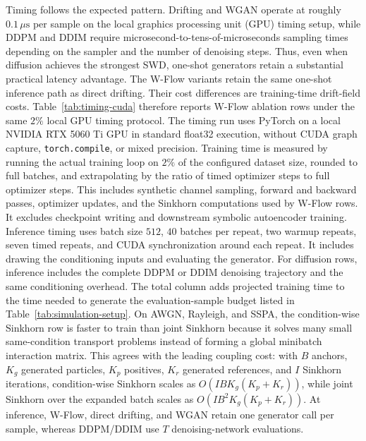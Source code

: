 \documentclass[10pt,journal]{IEEEtran}
\begin{document}
Timing follows the expected pattern.
Drifting and WGAN operate at roughly \(0.1\,\mu\mathrm{s}\) per sample on the local graphics processing unit (GPU) timing setup, while DDPM and DDIM require microsecond-to-tens-of-microseconds sampling times depending on the sampler and the number of denoising steps.
Thus, even when diffusion achieves the strongest SWD, one-shot generators retain a substantial practical latency advantage.
The W-Flow variants retain the same one-shot inference path as direct drifting.
Their cost differences are training-time drift-field costs.
Table~\ref{tab:timing-cuda} therefore reports W-Flow ablation rows under the same \(2\%\) local GPU timing protocol.
The timing run uses PyTorch on a local NVIDIA RTX 5060 Ti GPU in standard float32 execution, without CUDA graph capture, \texttt{torch.compile}, or mixed precision.
Training time is measured by running the actual training loop on \(2\%\) of the configured dataset size, rounded to full batches, and extrapolating by the ratio of timed optimizer steps to full optimizer steps.
This includes synthetic channel sampling, forward and backward passes, optimizer updates, and the Sinkhorn computations used by W-Flow rows.
It excludes checkpoint writing and downstream symbolic autoencoder training.
Inference timing uses batch size \(512\), \(40\) batches per repeat, two warmup repeats, seven timed repeats, and CUDA synchronization around each repeat.
It includes drawing the conditioning inputs and evaluating the generator.
For diffusion rows, inference includes the complete DDPM or DDIM denoising trajectory and the same conditioning overhead.
The total column adds projected training time to the time needed to generate the evaluation-sample budget listed in Table~\ref{tab:simulation-setup}.
On AWGN, Rayleigh, and SSPA, the condition-wise Sinkhorn row is faster to train than joint Sinkhorn because it solves many small same-condition transport problems instead of forming a global minibatch interaction matrix.
This agrees with the leading coupling cost: with \(B\) anchors, \(K_g\) generated particles, \(K_p\) positives, \(K_r\) generated references, and \(I\) Sinkhorn iterations, condition-wise Sinkhorn scales as \(O(I B K_g(K_p+K_r))\), while joint Sinkhorn over the expanded batch scales as \(O(I B^2 K_g(K_p+K_r))\).
At inference, W-Flow, direct drifting, and WGAN retain one generator call per sample, whereas DDPM/DDIM use \(T\) denoising-network evaluations.


\end{document}
